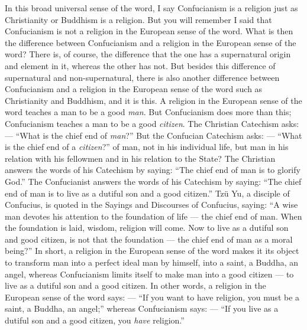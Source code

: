 In this broad universal sense of the word, I say Confucianism is a religion just as Christianity or Buddhism is a religion.
But you will remember I said that Confucianism is not a religion in the European sense of the word.
What is then the difference between Confucianism and a religion in the European sense of the word?
There is, of course, the difference that the one has a supernatural origin and element in it, whereas the other has not.
But besides this difference of supernatural and non-supernatural, there is also another difference between Confucianism and a religion in the European sense of the word such as Christianity and Buddhism, and it is this.
A religion in the European sense of the word teaches a man to be a good \emph{man}.
But Confucianism does more than this; Confucianism teaches a man to be a good \emph{citizen}.
The Christian Catechism asks: --- ``What is the chief end of \emph{man}?''
But the Confucian Catechism asks: --- ``What is the chief end of a \emph{citizen}?'' of man, not in his individual life, but man in his relation with his fellowmen and in his relation to the State?
The Christian answers the words of his Catechism by saying: ``The chief end of man is to glorify God.''
The Confucianist answers the words of his Catechism by saying: ``The chief end of man is to live as a dutiful son and a good citizen.''
Tz\"u Yu, a disciple of Confucius, is quoted in the Sayings and Discourses of Confucius, saying: ``A wise man devotes his attention to the foundation of life --- the chief end of man. When the foundation is laid, wisdom, religion will come. Now to live as a dutiful son and good citizen, is not that the foundation --- the chief end of man as a moral being?''
In short, a religion in the European sense of the word makes it its object to transform man into a perfect ideal man by himself, into a saint, a Buddha, an angel, whereas Confucianism limits itself to make man into a good citizen --- to live as a dutiful son and a good citizen.
In other words, a religion in the European sense of the word says: --- ``If you want to have religion, you must be a saint, a Buddha, an angel;'' whereas Confucianism says: --- ``If you live as a dutiful son and a good citizen, you \emph{have} religion.''


